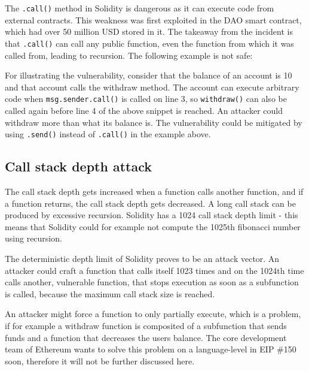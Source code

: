The \texttt{.call()} method in Solidity is dangerous as it can execute code from external contracts. This weakness was first exploited in the DAO smart contract, which had over 50 million USD stored in it. The takeaway from the incident is that \texttt{.call()} can call any public function, even the function from which it was called from, leading to recursion.
The following example is not safe:



For illustrating the vulnerability, consider that the balance of an account is 10 and that account calls the withdraw method. The account can execute arbitrary code when \texttt{msg.sender.call()} is called on line 3, so \texttt{withdraw()} can also be called again before line 4 of the above snippet is reached. An attacker could withdraw more than what its balance is. The vulnerability could be mitigated by using \texttt{.send()} instead of \texttt{.call()} in the example above.

\subsection{Call stack depth attack}

The call stack depth gets increased when a function calls another function, and if a function returns, the call stack depth gets decreased. A long call stack can be produced by excessive recursion. Solidity has a 1024 call stack depth limit - this means that Solidity could for example not compute the 1025th fibonacci number using recursion.

The deterministic depth limit of Solidity proves to be an attack vector. An attacker could craft a function that calls itself 1023 times and on the 1024th time calls another, vulnerable function, that stops execution as soon as a subfunction is called, because the maximum call stack size is reached. 

An attacker might force a function to only partially execute, which is a problem, if for example a withdraw function is composited of a subfunction that sends funds and a function that decreases the users balance.
The core development team of Ethereum wants to solve this problem on a language-level in EIP \#150 \cite{EIP150} soon, therefore it will not be further discussed here.
